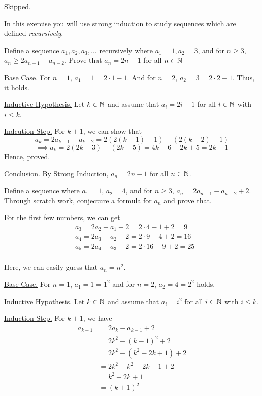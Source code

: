 \bp Skipped. \ep

\bp In this exercise you will use strong induction to study sequences which are defined \emph{recursively}.
\bnum
\item Define a sequence $a_1, a_2, a_3, \ldots$ recursively where $a_1 = 1, a_2 = 3$, and for $n \geq 3$, $a_n \geq 2a_{n-1} - a_{n-2}$.
	Prove that $a_n = 2n-1$ for all $n \in \mathbb{N}$

	\bs
	\underline{Base Case.} For $n = 1$, $a_1 = 1 = 2 \cdot 1 - 1$. And for $n = 2$, $a_2 = 3 = 2 \cdot 2 - 1$. Thus, it holds.

	\underline{Inductive Hypothesis.} Let $k \in \mathbb{N}$ and assume that $a_i = 2i-1$ for all $i \in \mathbb{N}$ with $i \leq k$.

	\underline{Indcution Step.} For $k+1$, we can show that
	$$a_k = 2a_{k-1} - a_{k-2} = 2(2(k-1)-1) - (2(k-2)-1)$$
	$$\implies a_k = 2(2k-3) - (2k-5) = 4k-6 -2k+5 = 2k-1$$
	Hence, proved.

	\underline{Conclusion.} By Strong Induction, $a_n = 2n-1$ for all $n \in \mathbb{N}$.
	\es

\item Define a sequence where $a_1 = 1$, $a_2 = 4$, and for $n \geq 3$, $a_n = 2a_{n-1} - a_{n-2} + 2$. 
	Through scratch work, conjecture a formula for $a_n$ and prove that.

	\begin{scratch}
		For the first few numbers, we can get
		\begin{align*}
			&a_3 = 2a_2 - a_1 + 2 = 2 \cdot 4 - 1 + 2 = 9 \\
			&a_4 = 2a_3 - a_2 + 2 = 2 \cdot 9 - 4 + 2 = 16 \\
			&a_5 = 2a_4 - a_3 + 2 = 2 \cdot 16 - 9 + 2 = 25 \\
		\end{align*}

		Here, we can easily guess that $a_n = n^2$.
	\end{scratch}

	\bs
	\underline{Base Case.} For $n = 1$, $a_1 = 1 = 1^2$ and for $n = 2$, $a_2 = 4 = 2^2$ holds.

	\underline{Inductive Hypothesis.} Let $k \in \mathbb{N}$ and assume that $a_i = i^2$ for all $i \in \mathbb{N}$ with $i \leq k$.

	\underline{Induction Step.} For $k+1$, we have
	\begin{align*}
		a_{k+1} &= 2a_{k} - a_{k-1} + 2 \\
						&= 2k^2 - (k-1)^2 + 2 \\ 
						&= 2k^2 - (k^2 - 2k + 1) + 2 \\
						&= 2k^2 - k^2 + 2k - 1 + 2 \\
						&= k^2 + 2k + 1 \\
						&= (k+1)^2
	\end{align*}

